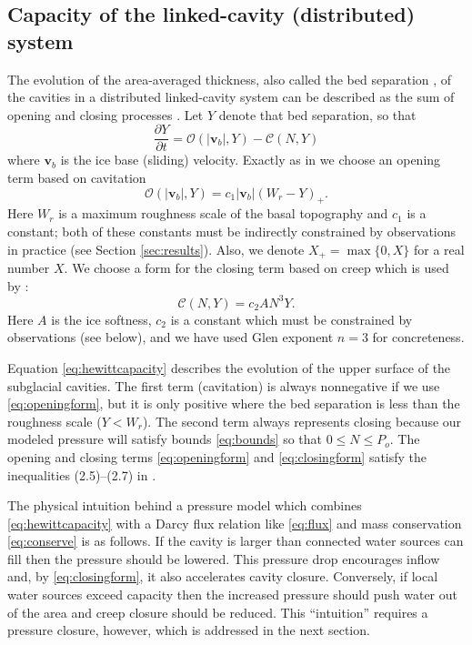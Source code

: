 \documentclass[11pt,final]{amsart}
\newcommand\bv{\mathbf{v}}
\begin{document}
\subsection*{Capacity of the linked-cavity (distributed) system}  The evolution of the area-averaged thickness, also called the bed separation \citep{Bartholomausetal2011}, of the cavities in a distributed linked-cavity system \citep{Schoofetal2012} can be described as the sum of opening and closing processes \citep{Hewitt2011}.  Let $Y$ denote that bed separation, so that
\begin{equation}
\frac{\partial Y}{\partial t} = \mathcal{O}(|\bv_b|,Y) - \mathcal{C}(N,Y) \label{eq:hewittcapacity}
\end{equation}
where $\bv_b$ is the ice base (sliding) velocity.  Exactly as in \cite{Schoofetal2012} we choose an opening term based on cavitation
\begin{equation}
 \mathcal{O}(|\bv_b|,Y) = c_1 |\bv_b| (W_r - Y)_+. \label{eq:openingform}
\end{equation}
Here $W_r$ is a maximum roughness scale of the basal topography and $c_1$ is a constant; both of these constants must be indirectly constrained by observations in practice (see Section \ref{sec:results}).  Also, we denote $X_+= \max\{0,X\}$ for a real number $X$.  We choose a form for the closing term based on creep which is used by  \cite{Hewitt2011,Schoofmeltsupply,Schoofetal2012}:
\begin{equation}
\mathcal{C}(N,Y) = c_2 A N^3 Y. \label{eq:closingform}
\end{equation}
Here $A$ is the ice softness, $c_2$ is a constant which must be constrained by observations (see below), and we have used Glen exponent $n=3$ for concreteness.

Equation \eqref{eq:hewittcapacity} describes the evolution of the upper surface of the subglacial cavities.  The first term (cavitation) is always nonnegative if we use \eqref{eq:openingform}, but it is only positive where the bed separation is less than the roughness scale ($Y<W_r$).  The second term always represents closing because our modeled pressure will satisfy bounds \eqref{eq:bounds} so that $0\le N \le P_o$.  The opening and closing terms \eqref{eq:openingform} and \eqref{eq:closingform} satisfy the inequalities (2.5)--(2.7) in \cite{Schoofetal2012}.

The physical intuition behind a pressure model which combines \eqref{eq:hewittcapacity} with a Darcy flux relation like \eqref{eq:flux} and mass conservation \eqref{eq:conserve} is as follows.  If the cavity is larger than connected water sources can fill then the pressure should be lowered.  This pressure drop encourages inflow and, by \eqref{eq:closingform}, it also accelerates cavity closure.  Conversely, if local water sources exceed capacity then the increased pressure should push water out of the area and creep closure should be reduced.  This ``intuition'' requires a pressure closure, however, which is addressed in the next section.
\end{document}

